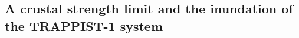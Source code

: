\documentclass[trackchanges]{aastex63}
\newcommand{\todo}[1]{\textit{\textcolor{violet}{{#1}}}}
\begin{document}






\subsection{A crustal strength limit and the inundation of the TRAPPIST-1 system}
\end{document}
